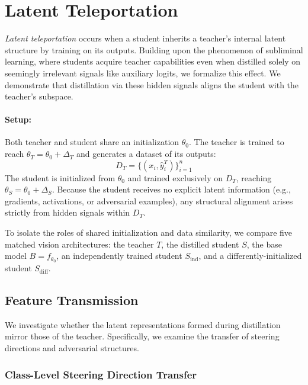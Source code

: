 \section{Latent Teleportation}
\label{sec:latent_teleportation}

\emph{Latent teleportation} occurs when a student inherits a teacher's internal latent structure by training on its outputs. Building upon the phenomenon of subliminal learning, where students acquire teacher capabilities even when distilled solely on seemingly irrelevant signals like auxiliary logits, we formalize this effect. We demonstrate that distillation via these hidden signals aligns the student with the teacher's subspace. 

\paragraph{Setup:}
\label{sec:overall_setup}
Both teacher and student share an initialization $\theta_0$. The teacher is trained to reach $\theta_T = \theta_0 + \Delta_T$ and generates a dataset of its outputs:
\[
D_T=\bigl\{(x_i,\hat{y}_i^{T})\bigr\}_{i=1}^{n}
\]
The student is initialized from $\theta_0$ and trained exclusively on $D_T$, reaching $\theta_S = \theta_0 + \Delta_S$. Because the student receives no explicit latent information (e.g., gradients, activations, or adversarial examples), any structural alignment arises strictly from hidden signals within $D_T$.

To isolate the roles of shared initialization and data similarity, we compare five matched vision architectures: the teacher $T$, the distilled student $S$, the base model $B=f_{\theta_0}$, an independently trained student $S_{\mathrm{ind}}$, and a differently-initialized student $S_{\mathrm{diff}}$.


\subsection{Feature Transmission}
\label{sec:features_transmission}

We investigate whether the latent representations formed during distillation mirror those of the teacher. Specifically, we examine the transfer of steering directions and adversarial structures.

\subsubsection{Class-Level Steering Direction Transfer}
\label{sec:class_level_steering_transfer}

